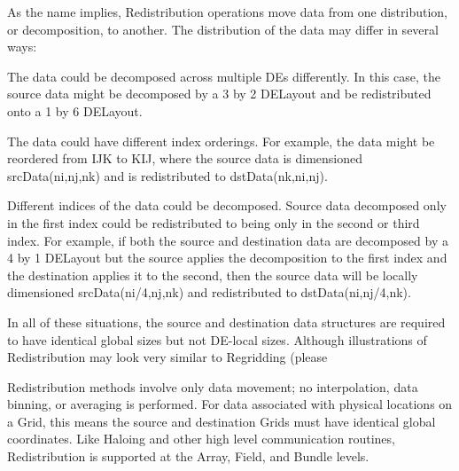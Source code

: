 

As the name implies, Redistribution operations move data from one distribution,
or decomposition, to another.  The distribution of the data may differ in several 
ways:
 \begin{description}

  \item The data could be decomposed across multiple DEs differently.  In this
        case, the source data might be decomposed by a 3 by 2 DELayout and be
        redistributed onto a 1 by 6 DELayout.

  \item The data could have different index orderings.  For example, the data
        might be reordered from IJK to KIJ, where the source data is
        dimensioned srcData(ni,nj,nk) and is redistributed to dstData(nk,ni,nj).

  \item Different indices of the data could be decomposed.  Source data
        decomposed only in the first index could be redistributed to being
        only in the second or third index.  For example, if both the source
        and destination data are decomposed by a 4 by 1 DELayout but the source
        applies the decomposition to the first index and the destination
        applies it to the second, then the source data will be locally
        dimensioned srcData(ni/4,nj,nk) and redistributed to dstData(ni,nj/4,nk).

 \end{description}

In all of these situations, the source and destination data structures are
required to have identical global sizes but not DE-local sizes.  Although
illustrations of Redistribution may look very similar to Regridding (please


Redistribution methods involve only data movement; no interpolation, data
binning, or averaging is performed.  For data associated with physical locations
on a Grid, this means the source and destination Grids must have identical
global coordinates.  Like Haloing and other high level communication routines,
Redistribution is supported at the Array, Field, and Bundle levels. 

